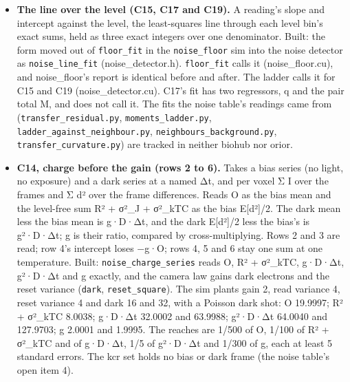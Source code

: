 \begin{enumerate}
\begin{itemize}
\item \textbf{The line over the level (C15, C17 and C19).} A reading's slope and intercept against the level, the least-squares line through each level bin's exact sums, held as three exact integers over one denominator. Built: the form moved out of \texttt{floor\_\allowbreak{}fit} in the \texttt{noise\_\allowbreak{}floor} sim into the noise detector as \texttt{noise\_\allowbreak{}line\_\allowbreak{}fit} (noise\_\allowbreak{}detector.h). \texttt{floor\_\allowbreak{}fit} calls it (noise\_\allowbreak{}floor.cu), and noise\_\allowbreak{}floor's report is identical before and after. The ladder calls it for C15 and C19 (noise\_\allowbreak{}detector.cu). C17's fit has two regressors, q and the pair total M, and does not call it. The fits the noise table's readings came from (\texttt{transfer\_\allowbreak{}residual.\allowbreak{}py}, \texttt{moments\_\allowbreak{}ladder.\allowbreak{}py}, \texttt{ladder\_\allowbreak{}against\_\allowbreak{}neighbour.\allowbreak{}py}, \texttt{neighbours\_\allowbreak{}background.\allowbreak{}py}, \texttt{transfer\_\allowbreak{}curvature.\allowbreak{}py}) are tracked in neither biohub nor orior.
\item \textbf{C14, charge before the gain (rows 2 to 6).} Takes a bias series (no light, no exposure) and a dark series at a named Δt, and per voxel Σ I over the frames and Σ d² over the frame differences. Reads O as the bias mean and the level-free sum R² + σ²\_\allowbreak{}J + σ²\_\allowbreak{}kTC as the bias E[d²]/2. The dark mean less the bias mean is g·D·Δt, and the dark E[d²]/2 less the bias's is g²·D·Δt; g is their ratio, compared by cross-multiplying. Rows 2 and 3 are read; row 4's intercept loses −g·O; rows 4, 5 and 6 stay one sum at one temperature. Built: \texttt{noise\_\allowbreak{}charge\_\allowbreak{}series} reads O, R² + σ²\_\allowbreak{}kTC, g·D·Δt, g²·D·Δt and g exactly, and the camera law gains dark electrons and the reset variance (\texttt{dark}, \texttt{reset\_\allowbreak{}square}). The sim plants gain 2, read variance 4, reset variance 4 and dark 16 and 32, with a Poisson dark shot: O 19.9997; R² + σ²\_\allowbreak{}kTC 8.0038; g·D·Δt 32.0002 and 63.9988; g²·D·Δt 64.0040 and 127.9703; g 2.0001 and 1.9995. The reaches are 1/500 of O, 1/100 of R² + σ²\_\allowbreak{}kTC and of g·D·Δt, 1/5 of g²·D·Δt and 1/300 of g, each at least 5 standard errors. The kcr set holds no bias or dark frame (the noise table's open item 4).

\end{itemize}
\end{enumerate}
